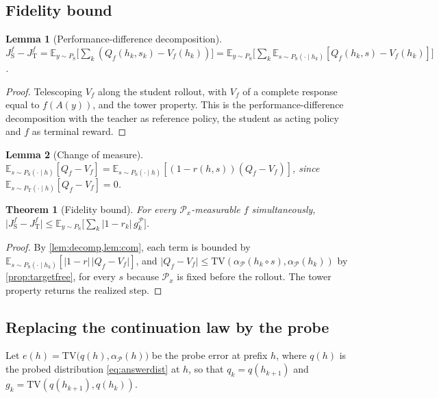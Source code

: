 \documentclass[11pt]{article}
\newtheorem{theorem}{Theorem}
\newtheorem{lemma}{Lemma}
\theoremstyle{definition}
\theoremstyle{remark}
\newcommand{\PT}{P_{\mathrm{T}}}
\newcommand{\PS}{P_{\mathrm{S}}}
\newcommand{\JT}{J_{\mathrm{T}}}
\newcommand{\JS}{J_{\mathrm{S}}}
\newcommand{\TV}{\mathrm{TV}}
\newcommand{\E}{\mathbb{E}}
\begin{document}
\subsection{Fidelity bound}

\begin{lemma}[Performance-difference decomposition]
\label{lem:decomp}
$\JS^f-\JT^f=\E_{y\sim\PS}\big[\sum_{k}(Q_f(h_k,s_k)-V_f(h_k))\big]=\E_{y\sim\PS}\big[\sum_k\E_{s\sim\PS(\cdot\mid h_k)}[Q_f(h_k,s)-V_f(h_k)]\big]$.
\end{lemma}
\begin{proof}
Telescoping $V_f$ along the student rollout, with $V_f$ of a complete response equal to $f(A(y))$, and the tower property. This is the performance-difference decomposition \citep{kakade2002approximately} with the teacher as reference policy, the student as acting policy and $f$ as terminal reward.
\end{proof}

\begin{lemma}[Change of measure]
\label{lem:com}
$\E_{s\sim\PS(\cdot\mid h)}[Q_f-V_f]=\E_{s\sim\PS(\cdot\mid h)}[(1-r(h,s))(Q_f-V_f)]$, since $\E_{s\sim\PT(\cdot\mid h)}[Q_f-V_f]=0$.
\end{lemma}

\begin{theorem}[Fidelity bound]
\label{thm:main}
For every $\mathcal P_x$-measurable $f$ simultaneously,
$\big\lvert\JS^f-\JT^f\big\rvert\le\E_{y\sim\PS}\big[\sum_k\lvert1-r_k\rvert\,g^{\mathcal P}_k\big]$.
\end{theorem}
\begin{proof}
By \cref{lem:decomp,lem:com}, each term is bounded by $\E_{s\sim\PS(\cdot\mid h_k)}[\lvert1-r\rvert\,\lvert Q_f-V_f\rvert]$, and $\lvert Q_f-V_f\rvert\le\TV(\alpha_{\mathcal P}(h_k\circ s),\alpha_{\mathcal P}(h_k))$ by \cref{prop:targetfree}, for every $s$ because $\mathcal P_x$ is fixed before the rollout. The tower property returns the realized step.
\end{proof}

\subsection{Replacing the continuation law by the probe}

Let $e(h)=\TV\big(q(h),\alpha_{\mathcal P}(h)\big)$ be the probe error at prefix $h$, where $q(h)$ is the probed distribution \cref{eq:answerdist} at $h$, so that $q_k=q(h_{k+1})$ and $g_k=\TV(q(h_{k+1}),q(h_k))$.
\end{document}
